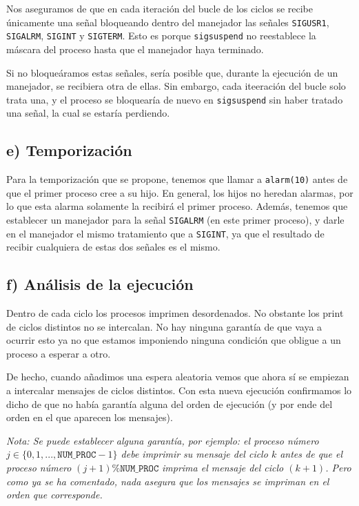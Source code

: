 \documentclass{article}
\begin{document}
Nos aseguramos de que en cada iteración del bucle de los ciclos se recibe únicamente una señal bloqueando dentro del manejador las señales \texttt{SIGUSR1}, \texttt{SIGALRM}, \texttt{SIGINT} y \texttt{SIGTERM}. Esto es porque \texttt{sigsuspend} no reestablece la máscara del proceso hasta que el manejador haya terminado. 

Si no bloqueáramos estas señales, sería posible que, durante la ejecución de un manejador, se recibiera otra de ellas. Sin embargo, cada iteeración del bucle solo trata una, y el proceso se bloquearía de nuevo en \texttt{sigsuspend} sin haber tratado una señal, la cual se estaría perdiendo.


\subsection*{e) Temporización}

Para la temporización que se propone, tenemos que llamar a \texttt{alarm(10)} antes de que el primer proceso cree a su hijo. En general, los hijos no heredan alarmas, por lo que esta alarma solamente la recibirá el primer proceso. Además, tenemos que establecer un manejador para la señal \texttt{SIGALRM} (en este primer proceso), y darle en el manejador el mismo tratamiento que a \texttt{SIGINT}, ya que el resultado de recibir cualquiera de estas dos señales es el mismo. 

\subsection*{f) Análisis de la ejecución}

Dentro de cada ciclo los procesos imprimen desordenados. No obstante los print de ciclos distintos no se intercalan. No hay ninguna garantía de que vaya a ocurrir esto ya no que estamos imponiendo ninguna condición que obligue a un proceso a esperar a otro. 

De hecho, cuando añadimos una espera aleatoria vemos que ahora sí se empiezan a intercalar mensajes de ciclos distintos. Con esta nueva ejecución confirmamos lo dicho de que no había garantía alguna del orden de ejecución (y por ende del orden en el que aparecen los mensajes).

\textit{Nota: Se puede establecer alguna garantía, por ejemplo: el proceso número $j\in \{0,1,...,\texttt{NUM\_PROC}-1\}$ debe imprimir su mensaje del ciclo $k$ antes de que el proceso número} $(j+1)\%\texttt{NUM\_PROC}$ \textit{imprima el mensaje del ciclo $(k+1)$. Pero como ya se ha comentado, nada asegura que los mensajes se impriman en el orden que corresponde.}\par
\end{document}
